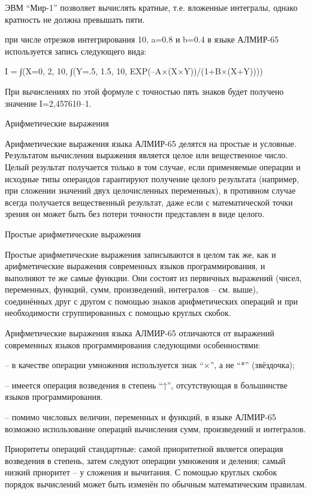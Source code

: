 \documentclass[11pt]{article}
\begin{document}
ЭВМ “Мир-1” позволяет вычислять
кратные, т.е. вложенные интегралы,
однако кратность не должна превышать
пяти.

  при числе отрезков интегрирования 10,
a=0.8 и b=0.4 в языке АЛМИР-65 используется
запись следующего вида:

I = ∫(X=0, 2, 10, ∫(Y=.5, 1.5, 10, EXP(–A×(X×Y))/(1+B×(X+Y))))

При вычислениях по этой формуле с
точностью пять знаков будет получено
значение I=2,457610–1.

Арифметические выражения

Арифметические выражения языка АЛМИР-65
делятся на простые и условные.
Результатом вычисления выражения
является целое или вещественное число.
Целый результат получается только в
том случае, если применяемые операции и
исходные типы операндов гарантируют
получение целого результата (например,
при сложении значений двух
целочисленных переменных), в противном
случае всегда получается вещественный
результат, даже если с математической
точки зрения он может быть без потери
точности представлен в виде целого.

Простые арифметические выражения

Простые арифметические выражения
записываются в целом так же, как и
арифметические выражения современных
языков программирования, и выполняют
те же самые функции. Они состоят из
первичных выражений (чисел, переменных,
функций, сумм, произведений, интегралов
– см. выше), соединённых друг с другом с
помощью знаков арифметических
операций и при необходимости
сгруппированных с помощью круглых
скобок.

Арифметические выражения языка АЛМИР-65
отличаются от выражений современных
языков программирования следующими
особенностями:

– в качестве операции умножения
используется знак “×”, а не “*”
(звёздочка);

– имеется операция возведения в
степень “↑”, отсутствующая в
большинстве языков программирования.

– помимо числовых величин, переменных
и функций, в языке АЛМИР-65 возможно
использование операций вычисления
сумм, произведений и интегралов.

Приоритеты операций стандартные: самой
приоритетной является операция
возведения в степень, затем следуют
операции умножения и деления; самый
низкий приоритет – у сложения и
вычитания. С помощью круглых скобок
порядок вычислений может быть изменён
по обычным математическим правилам.
\end{document}
